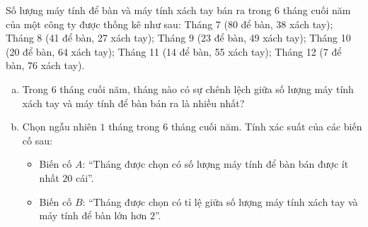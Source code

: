 \begin{bt}%
Số lượng máy tính để bàn và máy tính xách tay bán ra trong $6$ tháng cuối năm của một công ty được thống kê như sau: Tháng 7 (80 để bàn, 38 xách tay); Tháng 8 (41 để bàn, 27 xách tay); Tháng 9 (23 để bàn, 49 xách tay); Tháng 10 (20 để bàn, 64 xách tay); Tháng 11 (14 để bàn, 55 xách tay); Tháng 12 (7 để bàn, 76 xách tay).
	\begin{enumerate}[a)]
		\item Trong $6$ tháng cuối năm, tháng nào có sự chênh lệch giữa số lượng máy tính xách tay và máy tính để bàn bán ra là nhiều nhất?
		\item Chọn ngẫu nhiên $1$ tháng trong $6$ tháng cuối năm. Tính xác suất của các biến cố sau:
		\begin{itemize}
			\item Biến cố $A$: ``Tháng được chọn có số lượng máy tính để bàn bán được ít nhất $20$ cái''.
			\item Biến cố $B$: ``Tháng được chọn có tỉ lệ giữa số lượng máy tính xách tay và máy tính để bàn lớn hơn $2$''.
		\end{itemize}
	\end{enumerate}
\end{bt}
